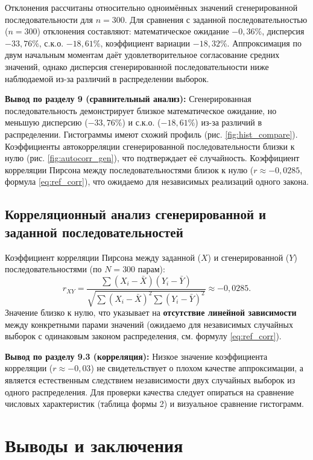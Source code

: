 \documentclass[a4paper,12pt]{article}
\begin{document}
Отклонения рассчитаны относительно одноимённых значений сгенерированной последовательности для $n=300$. Для сравнения с заданной последовательностью ($n=300$) отклонения составляют: математическое ожидание $-0{,}36$\%, дисперсия $-33{,}76$\%, с.к.о. $-18{,}61$\%, коэффициент вариации $-18{,}32$\%. Аппроксимация по двум начальным моментам даёт удовлетворительное согласование средних значений, однако дисперсия сгенерированной последовательности ниже наблюдаемой из-за различий в распределении выборок.

\textbf{Вывод по разделу 9 (сравнительный анализ):} Сгенерированная последовательность демонстрирует близкое математическое ожидание, но меньшую дисперсию ($-33{,}76$\%) и с.к.о. ($-18{,}61$\%) из-за различий в распределении. Гистограммы имеют схожий профиль (рис. \ref{fig:hist_compare}). Коэффициенты автокорреляции сгенерированной последовательности близки к нулю (рис. \ref{fig:autocorr_gen}), что подтверждает её случайность. Коэффициент корреляции Пирсона между последовательностями близок к нулю ($r \approx -0{,}0285$, формула \ref{eq:ref_corr}), что ожидаемо для независимых реализаций одного закона.

\subsection{Корреляционный анализ сгенерированной и заданной последовательностей}

Коэффициент корреляции Пирсона между заданной ($X$) и сгенерированной ($Y$) последовательностями (по $N=300$ парам):
\begin{equation*}
r_{XY} = \frac{\sum (X_i - \bar{X})(Y_i - \bar{Y})}{\sqrt{\sum (X_i - \bar{X})^2 \sum (Y_i - \bar{Y})^2}} \approx -0{,}0285.
\end{equation*}
Значение близко к нулю, что указывает на \textbf{отсутствие линейной зависимости} между конкретными парами значений (ожидаемо для независимых случайных выборок с одинаковым законом распределения, см. формулу \ref{eq:ref_corr}).

\textbf{Вывод по разделу 9.3 (корреляция):} Низкое значение коэффициента корреляции ($r \approx -0{,}03$) не свидетельствует о плохом качестве аппроксимации, а является естественным следствием независимости двух случайных выборок из одного распределения. Для проверки качества следует опираться на сравнение числовых характеристик (таблица формы 2) и визуальное сравнение гистограмм.

\section{Выводы и заключения}
\end{document}

